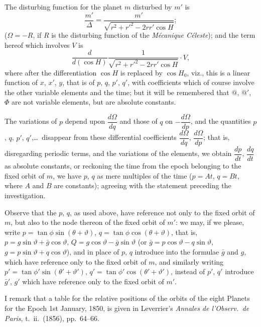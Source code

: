 \documentclass[11pt,a4paper]{article}
\theoremstyle{plain}
\theoremstyle{definition}
\theoremstyle{remark}
\begin{document}
The disturbing function for the planet $m$ disturbed by $m'$ is
\[
\frac{m'}{\Delta} = \frac{m'}{\sqrt{r^{2} + r'^{2} - 2rr'\cos H}};
\]
($\Omega=-R$, if $R$ is the disturbing function of the \textit{M\'ecanique C\'eleste});
and the term hereof which involves $V$ is
\[
\frac{d}{d(\cos H)}\frac{1}{\sqrt{r^{2}+r'^{2}-2rr'\cos H}} \cdot V,
\]
where after the differentiation $\cos H$ is replaced by $\cos H_{0}$, viz., this is a linear function of $x$, $x'$, $y$, that is of $p$, $q$, $p'$, $q'$, with coefficients which of course involve the other variable elements and the time; but it will be remembered that $@$, $@'$, $\Phi$ are not variable elements, but are absolute constants.

The variations of $p$ depend upon $\dfrac{d\Omega}{dq}$ and those of $q$ on $-\dfrac{d\Omega}{dp}$, and the quantities $p$, $q$, $p'$, $q'$,\dots\ disappear from these differential coefficients $\dfrac{d\Omega}{dq}$, $\dfrac{d\Omega}{dp}$; that is, disregarding periodic terms, and the variations of the elements, we obtain $\dfrac{dp}{dt}$, $\dfrac{dq}{dt}$ as absolute constants, or reckoning the time from the epoch belonging to the fixed orbit of $m$, we have $p$, $q$ as mere multiples of the time ($p=At$, $q=Bt$, where $A$ and $B$ are constants); agreeing with the statement preceding the investigation.

Observe that the $p$, $q$, as used above, have reference not only to the fixed orbit of $m$, but also to the node thereon of the fixed orbit of $m'$: we may, if we please, write $p=\tan\phi\sin(\theta+\vartheta)$, $q=\tan\phi\cos(\theta+\vartheta)$, that is, $p=g\sin\vartheta+\bar{g}\cos\vartheta$, $Q=g\cos\vartheta-\bar{g}\sin\vartheta$ (or $\bar{g}=p\cos\vartheta-q\sin\vartheta$, $g=p\sin\vartheta+q\cos\vartheta$), and in place of $p$, $q$ introduce into the formulae $\bar{g}$ and $g$, which have reference only to the fixed orbit of $m$, and similarly writing $p'=\tan\phi'\sin(\theta'+\vartheta')$, $q'=\tan\phi'\cos(\theta'+\vartheta')$, instead of $p'$, $q'$ introduce $\bar{g}'$, $g'$ which have reference only to the fixed orbit of $m'$.

I remark that a table for the relative positions of the orbits of the eight Planets for the Epoch 1st January, 1850, is given in Leverrier's \textit{Annales de l'Observ.\ de Paris}, t.\ ii.\ (1856), pp.\ 64--66.


\vspace{2em}

\newpage
\end{document}
